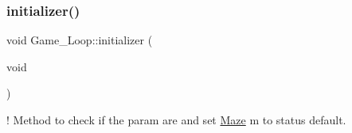 \mbox{\label{classGame__Loop_a637d18a3f2c22b5ecd4c3f1905e52b88}} 
\subsubsection{\texorpdfstring{initializer()}{initializer()}}
{\footnotesize\ttfamily void Game\+\_\+\+Loop\+::initializer (\begin{DoxyParamCaption}\item[{void}]{ }\end{DoxyParamCaption})}



! Method to check if the param are and set \hyperlink{classMaze}{Maze} m to status default. 


